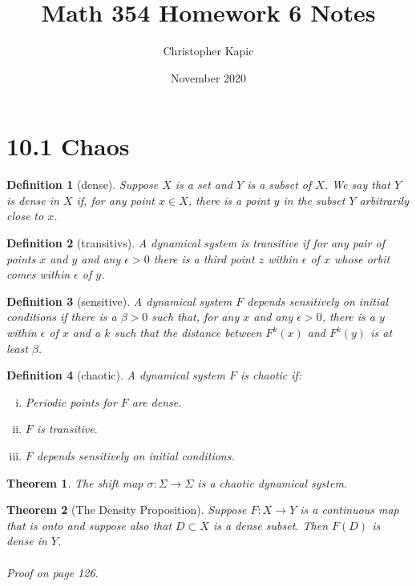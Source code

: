 \documentclass{article}
\title{Math 354 Homework 6 Notes}
\author{Christopher Kapic}
\date{November 2020}
\newtheorem{definition}{Definition}
\newtheorem{theorem}{Theorem}
\begin{document}
\maketitle

\section*{10.1 Chaos}

\begin{definition}[dense]
    Suppose $X$ is a set and $Y$ is a subset of $X$. We say that $Y$ is \textit{dense} in $X$ if, for any point $x \in X$, there is a point $y$ in the subset $Y$ arbitrarily close to $x$.
\end{definition}

\begin{definition}[transitivs]
    A dynamical system is \textit{transitive} if for any pair of points $x$ and $y$ and any $\epsilon > 0$ there is a third point $z$ within $\epsilon$ of $x$ whose orbit comes within $\epsilon$ of $y$.
\end{definition}

\begin{definition}[sensitive]
    A dynamical system $F$ \textit{depends sensitively on initial conditions} if there is a $\beta > 0$ such that, for any $x$ and any $\epsilon > 0$, there is a $y$ within $\epsilon$ of $x$ and a $k$ such that the distance between $F^k(x)$ and $F^k(y)$ is at least $\beta$.
\end{definition}

\begin{definition}[chaotic]
    A dynamical system $F$ is \textit{chaotic} if:
    \begin{enumerate}[(i)]
        \item Periodic points for $F$ are dense.
        \item $F$ is transitive.
        \item $F$ depends sensitively on initial conditions.
    \end{enumerate}
\end{definition}

\begin{theorem}
    The shift map $\sigma :\Sigma \rightarrow \Sigma$ is a chaotic dynamical system.
\end{theorem}

\begin{theorem}[The Density Proposition]
    Suppose $F:X\rightarrow Y$ is a continuous map that is onto and suppose also that $D \subset X$ is a dense subset. Then $F(D)$ is dense in $Y$.\\\\
    Proof on page 126.
\end{theorem}
\end{document}
